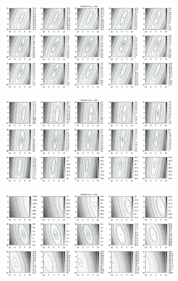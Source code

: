 \begin{appendix}
\begin{figure}[!ht]
\begin{subfigure}[t]{0.3\textwidth}
	\end{subfigure}
\\
	\centering
	\begin{subfigure}[t]{0.3\textwidth}
	     \centering
	     \includegraphics[width=\textwidth]{img/fitness/xy/a3.png}
	\end{subfigure}
	\begin{subfigure}[t]{0.3\textwidth}
		\centering
	     \includegraphics[width=\textwidth]{img/fitness/xz/a3.png}
	\end{subfigure}
	\begin{subfigure}[t]{0.3\textwidth}
			\centering
	   \includegraphics[width=\textwidth]{img/fitness/yz/a3.png}

\end{subfigure}
\end{figure}
\end{appendix}
